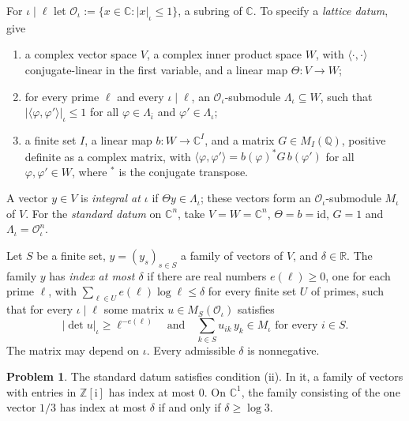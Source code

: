 \documentclass[reqno]{amsart}
\theoremstyle{definition}
\newtheorem{problem}{Problem}[section]
\theoremstyle{plain}
\newcommand{\Z}{\mathbb{Z}}
\newcommand{\Q}{\mathbb{Q}}
\newcommand{\R}{\mathbb{R}}
\newcommand{\C}{\mathbb{C}}
\newcommand{\Oc}{\mathcal{O}}
\newcommand{\ii}{\mathrm{i}}
\begin{document}
For \(\iota \mid \ell\) let \(\Oc_\iota := \{x \in \C : \lvert x \rvert_\iota \le 1\}\), a subring of \(\C\).  To specify a \emph{lattice datum}, give
\begin{enumerate}
\item[(i)] a complex vector space \(V\), a complex inner product space \(W\), with \(\langle \cdot, \cdot \rangle\) conjugate-linear in the first variable, and a linear map \(\Theta \colon V \to W\);
\item[(ii)] for every prime \(\ell\) and every \(\iota \mid \ell\), an \(\Oc_\iota\)-submodule \(\Lambda_\iota \subseteq W\), such that \(\lvert \langle \varphi, \varphi' \rangle \rvert_\iota \le 1\) for all \(\varphi \in \Lambda_{\bar\iota}\) and \(\varphi' \in \Lambda_\iota\);
\item[(iii)] a finite set \(I\), a linear map \(b \colon W \to \C^I\), and a matrix \(G \in M_I(\Q)\), positive definite as a complex matrix, with \(\langle \varphi, \varphi' \rangle = b(\varphi)^* G\, b(\varphi')\) for all \(\varphi, \varphi' \in W\), where \({}^*\) is the conjugate transpose.
\end{enumerate}
A vector \(y \in V\) is \emph{integral at \(\iota\)} if \(\Theta y \in \Lambda_\iota\); these vectors form an \(\Oc_\iota\)-submodule \(M_\iota\) of \(V\).  For the \emph{standard datum} on \(\C^n\), take \(V = W = \C^n\), \(\Theta = b = \mathrm{id}\), \(G = 1\) and \(\Lambda_\iota = \Oc_\iota^n\).

Let \(S\) be a finite set, \(y = (y_s)_{s \in S}\) a family of vectors of \(V\), and \(\delta \in \R\).  The family \(y\) has \emph{index at most \(\delta\)} if there are real numbers \(e(\ell) \ge 0\), one for each prime \(\ell\), with \(\sum_{\ell \in U} e(\ell) \log \ell \le \delta\) for every finite set \(U\) of primes, such that for every \(\iota \mid \ell\) some matrix \(u \in M_S(\Oc_\iota)\) satisfies
\[
  \lvert \det u \rvert_\iota \ge \ell^{-e(\ell)} \quad\text{and}\quad \sum_{k \in S} u_{ik}\, y_k \in M_\iota \text{ for every } i \in S .
\]
The matrix may depend on \(\iota\).  Every admissible \(\delta\) is nonnegative.

\begin{problem}\label{pr:index-basic}
The standard datum satisfies condition (ii).  In it, a family of vectors with entries in \(\Z[\ii]\) has index at most \(0\).  On \(\C^1\), the family consisting of the one vector \(1/3\) has index at most \(\delta\) if and only if \(\delta \ge \log 3\).
\end{problem}
\end{document}
